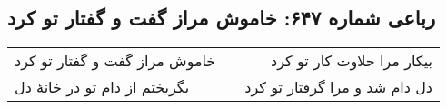 \begin{center}
\section*{رباعی شماره ۶۴۷: خاموش مراز گفت و گفتار تو کرد}
\label{sec:0647}
\begin{longtable}{l p{0.5cm} r}
خاموش مراز گفت و گفتار تو کرد
&&
بیکار مرا حلاوت کار تو کرد
\\
بگریختم از دام تو در خانهٔ دل
&&
دل دام شد و مرا گرفتار تو کرد
\\
\end{longtable}
\end{center}
